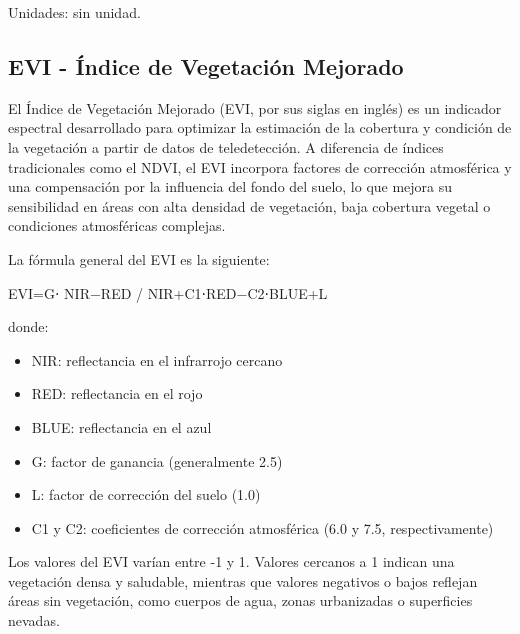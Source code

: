 \documentclass[
]{book}
\providecommand{\tightlist}{%
  \setlength{\itemsep}{0pt}\setlength{\parskip}{0pt}}
\begin{document}
Unidades: sin unidad.

\subsection{\texorpdfstring{\textbf{EVI} - Índice de Vegetación Mejorado}{EVI - Índice de Vegetación Mejorado}}\label{evi---uxedndice-de-vegetaciuxf3n-mejorado}

El Índice de Vegetación Mejorado (EVI, por sus siglas en inglés) es un indicador espectral desarrollado para optimizar la estimación de la cobertura y condición de la vegetación a partir de datos de teledetección. A diferencia de índices tradicionales como el NDVI, el EVI incorpora factores de corrección atmosférica y una compensación por la influencia del fondo del suelo, lo que mejora su sensibilidad en áreas con alta densidad de vegetación, baja cobertura vegetal o condiciones atmosféricas complejas.

La fórmula general del EVI es la siguiente:

EVI=G⋅ NIR−RED / NIR+C1\hspace{0pt}⋅RED−C2\hspace{0pt}⋅BLUE+L

donde:

\begin{itemize}
\tightlist
\item
  NIR: reflectancia en el infrarrojo cercano\\
\item
  RED: reflectancia en el rojo\\
\item
  BLUE: reflectancia en el azul\\
\item
  G: factor de ganancia (generalmente 2.5)\\
\item
  L: factor de corrección del suelo (1.0)\\
\item
  C1 y C2\hspace{0pt}: coeficientes de corrección atmosférica (6.0 y 7.5, respectivamente)
\end{itemize}

Los valores del EVI varían entre -1 y 1. Valores cercanos a 1 indican una vegetación densa y saludable, mientras que valores negativos o bajos reflejan áreas sin vegetación, como cuerpos de agua, zonas urbanizadas o superficies nevadas.
\end{document}
